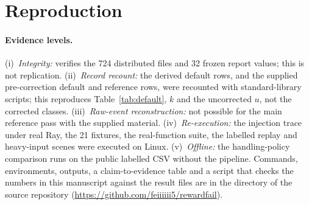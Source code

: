 \documentclass[10pt,a4paper]{article}
\begin{document}
\appendix
\section{Reproduction}

\paragraph{Evidence levels.}
(i)~\emph{Integrity:}  verifies the 724
distributed files and 32 frozen report values; this is not replication.
(ii)~\emph{Record recount:} the derived default rows, and the supplied
pre-correction default and reference rows, were recounted with
standard-library scripts; this reproduces Table~\ref{tab:default}, $k$ and the
uncorrected $u$, not the corrected classes. (iii)~\emph{Raw-event
reconstruction:} not possible for the main reference pass with the supplied
material. (iv)~\emph{Re-execution:} the injection trace under real Ray, the
21 fixtures, the real-function suite, the labelled replay and heavy-input
scenes were executed on Linux. (v)~\emph{Offline:} the handling-policy
comparison runs on the public labelled CSV without the pipeline. Commands,
environments, outputs, a claim-to-evidence table and a script that checks the
numbers in this manuscript against the result files are in the 
directory of the source repository
(\url{https://github.com/feiiiiii5/rewardfail}).
\end{document}
